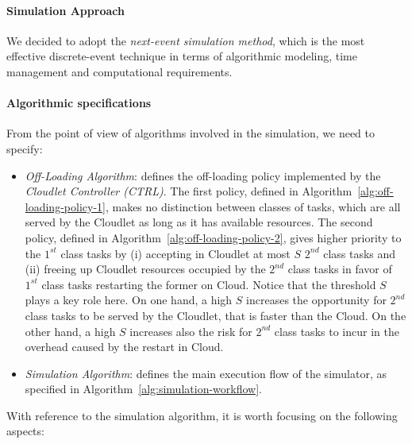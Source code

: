 \paragraph{Simulation Approach}
We decided to adopt the \textit{next-event simulation method}, which is the most effective discrete-event technique in terms of algorithmic modeling, time management and computational requirements.

\paragraph{Algorithmic specifications}
From the point of view of algorithms involved in the simulation, we need to specify:

\begin{itemize}
	
	\item \textit{Off-Loading Algorithm}: defines the off-loading policy implemented by the \textit{Cloudlet Controller (CTRL)}.
	The first policy, defined in Algorithm~\ref{alg:off-loading-policy-1}, makes no distinction between classes of tasks, which are all served by the Cloudlet as long as it has available resources. 
	The second policy, defined in Algorithm~\ref{alg:off-loading-policy-2}, gives higher priority to the $1^{st}$ class tasks by 
	(i) accepting in Cloudlet at most $S$ $2^{nd}$ class tasks and 
	(ii) freeing up Cloudlet resources occupied by the $2^{nd}$ class tasks in favor of $1^{st}$ class tasks restarting the former on Cloud.
	Notice that the threshold $S$ plays a key role here.
	On one hand, a high $S$ increases the opportunity for  $2^{nd}$ class tasks to be served by the Cloudlet, that is faster than the Cloud.
	On the other hand, a high $S$ increases also the risk for $2^{nd}$ class tasks to incur in the overhead caused by the restart in Cloud.
	
	\item \textit{Simulation Algorithm}: defines the main execution flow of the simulator, as specified in Algorithm~\ref{alg:simulation-workflow}.
\end{itemize}

With reference to the simulation algorithm, it is worth focusing on the following aspects:

